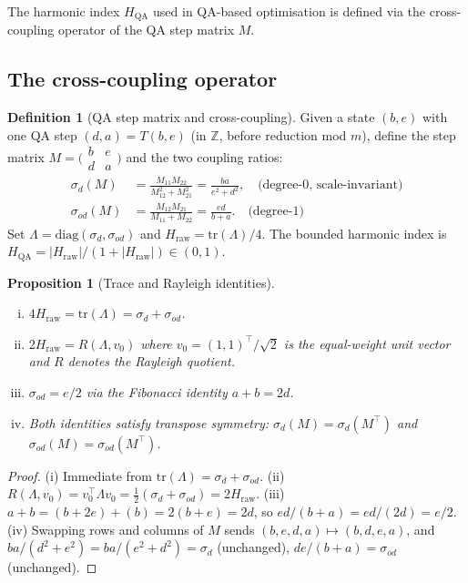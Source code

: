 \documentclass[11pt]{article}
\newtheorem{proposition}[theorem]{Proposition}
\theoremstyle{definition}
\newtheorem{definition}[theorem]{Definition}
\theoremstyle{remark}
\newcommand{\hqa}{H_{\mathrm{QA}}}
\newcommand{\hraw}{H_{\mathrm{raw}}}
\begin{document}
The harmonic index $\hqa$ used in QA-based optimisation is defined via the
cross-coupling operator of the QA step matrix $M$.

\subsection{The cross-coupling operator}

\begin{definition}[QA step matrix and cross-coupling]
\label{def:hqa}
Given a state $(b,e)$ with one QA step $(d,a)=T(b,e)$ (in $\mathbb{Z}$, before
reduction mod $m$), define the step matrix $M=\bigl(\begin{smallmatrix}b&e\\d&a
\end{smallmatrix}\bigr)$ and the two coupling ratios:
\begin{align*}
  \sigma_d(M)   &= \frac{M_{11}M_{22}}{M_{12}^2+M_{21}^2}
                 = \frac{ba}{e^2+d^2}, \quad\text{(degree-0, scale-invariant)} \\
  \sigma_{od}(M)&= \frac{M_{12}M_{21}}{M_{11}+M_{22}}
                 = \frac{ed}{b+a}. \quad\text{(degree-1)}
\end{align*}
Set $\Lambda=\mathrm{diag}(\sigma_d,\sigma_{od})$ and
$\hraw=\mathrm{tr}(\Lambda)/4$.  The bounded harmonic index is
$\hqa=|\hraw|/(1+|\hraw|)\in(0,1)$.
\end{definition}

\begin{proposition}[Trace and Rayleigh identities]
\label{prop:trace-rayleigh}
\begin{enumerate}[(i)]
  \item $4\hraw = \mathrm{tr}(\Lambda) = \sigma_d+\sigma_{od}$.
  \item $2\hraw = R(\Lambda,v_0)$ where $v_0=(1,1)^\top/\sqrt{2}$
    is the equal-weight unit vector and $R$ denotes the Rayleigh quotient.
  \item $\sigma_{od}=e/2$ via the Fibonacci identity $a+b=2d$.
  \item Both identities satisfy transpose symmetry:
    $\sigma_d(M)=\sigma_d(M^\top)$ and $\sigma_{od}(M)=\sigma_{od}(M^\top)$.
\end{enumerate}
\end{proposition}

\begin{proof}
(i) Immediate from $\mathrm{tr}(\Lambda)=\sigma_d+\sigma_{od}$.
(ii) $R(\Lambda,v_0)=v_0^\top\Lambda v_0=\tfrac{1}{2}(\sigma_d+\sigma_{od})=2\hraw$.
(iii) $a+b=(b+2e)+(b)=2(b+e)=2d$, so $ed/(b+a)=ed/(2d)=e/2$.
(iv) Swapping rows and columns of $M$ sends $(b,e,d,a)\mapsto(b,d,e,a)$, and
$ba/(d^2+e^2)=ba/(e^2+d^2)=\sigma_d$ (unchanged), $de/(b+a)=\sigma_{od}$ (unchanged). \qedhere
\end{proof}
\end{document}
